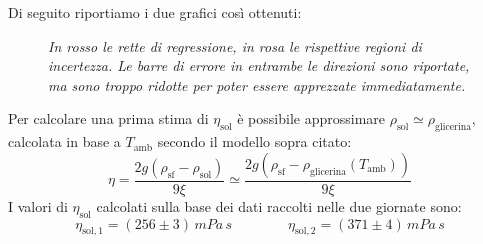 \documentclass{article}
\begin{document}
Di seguito riportiamo i due grafici così ottenuti:

\vspace{-2mm}
\begin{figure}[H]
  \centering
  \hfil{}
  \caption*{\emph{
    In rosso le rette di regressione, in rosa le rispettive
    regioni di incertezza.
    Le barre di errore in entrambe le direzioni sono riportate,
    ma sono troppo ridotte per poter essere apprezzate
    immediatamente.
  }}
\end{figure}

Per calcolare una prima stima di $\eta_\text{sol}$ è possibile approssimare
$\rho_\text{sol}\simeq\rho_\text{glicerina}$, calcolata in base
a $T_\text{amb}$ secondo il modello sopra citato:
\[
  \eta = \frac{2g(\rho_\text{sf} - \rho_\text{sol})}{9\xi}
  \simeq \frac{2g(\rho_\text{sf} -
    \rho_\text{glicerina}(T_\text{amb}))}{9\xi}
\]
I valori di $\eta_\text{sol}$ calcolati sulla base dei dati raccolti nelle
due giornate sono:
\[
  \eta_{\text{sol},1}=(256\pm3)\,\unit{mPa\,s}
  \qquad\qquad
  \eta_{\text{sol},2}=(371\pm4)\,\unit{mPa\,s}\]
\end{document}
